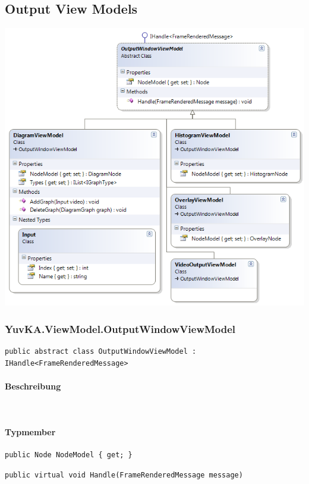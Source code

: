 \subsection{Output View Models}
\begin{center}\includegraphics[scale=0.7]{YuvKA.ViewModel/outputs.png} \\
\end{center}

\subsubsection{YuvKA.ViewModel.OutputWindowViewModel}

\begin{verbatim}
public abstract	class OutputWindowViewModel : IHandle<FrameRenderedMessage>
\end{verbatim}

\paragraph{Beschreibung}~\\

\paragraph{Typmember}
\begin{itemize}

	\begin{verbatim}
public Node NodeModel { get; }
	\end{verbatim}


	\begin{verbatim}
public virtual void Handle(FrameRenderedMessage message)
	\end{verbatim}


\end{itemize}

